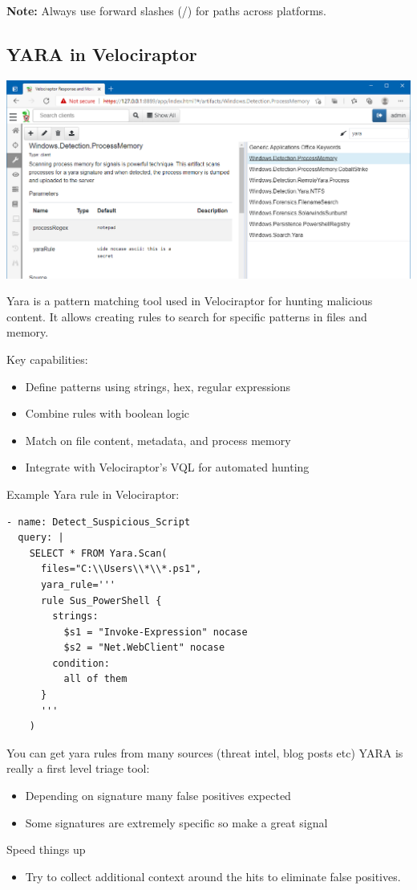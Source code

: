\textbf{Note:} Always use forward slashes (/) for paths across platforms.

\subsection{YARA in Velociraptor}
\includegraphics[width=\textwidth]{resources/06-yara.png}

Yara is a pattern matching tool used in Velociraptor for hunting malicious content. It allows creating rules to search for specific patterns in files and memory.

Key capabilities:
\begin{itemize}
  \item Define patterns using strings, hex, regular expressions
  \item Combine rules with boolean logic
  \item Match on file content, metadata, and process memory
  \item Integrate with Velociraptor's VQL for automated hunting
\end{itemize}

Example Yara rule in Velociraptor:

\begin{lstlisting}[basicstyle=\ttfamily]
- name: Detect_Suspicious_Script
  query: |
    SELECT * FROM Yara.Scan(
      files="C:\\Users\\*\\*.ps1",
      yara_rule='''
      rule Sus_PowerShell {
        strings:
          $s1 = "Invoke-Expression" nocase
          $s2 = "Net.WebClient" nocase
        condition:
          all of them
      }
      '''
    )
\end{lstlisting}

You can get yara rules from many sources (threat intel, blog posts etc)
YARA is really a first level triage tool:
\begin{itemize}
  \item Depending on signature many false positives expected
  \item Some signatures are extremely specific so make a great signal
\end{itemize}
Speed things up
\begin{itemize}
  \item Try to collect additional context around the hits to eliminate false positives.
\end{itemize}

